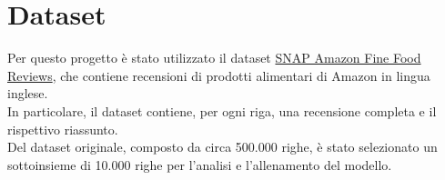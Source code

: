 \section{Dataset}
Per questo progetto è stato utilizzato il dataset \href{https://www.kaggle.com/datasets/snap/amazon-fine-food-reviews}{SNAP Amazon Fine Food Reviews}, che contiene recensioni di prodotti alimentari di Amazon in lingua inglese.\\
In particolare, il dataset contiene, per ogni riga, una recensione completa e il rispettivo riassunto.\\
Del dataset originale, composto da circa 500.000 righe, è stato selezionato un sottoinsieme di 10.000 righe per l'analisi e l'allenamento del modello.

